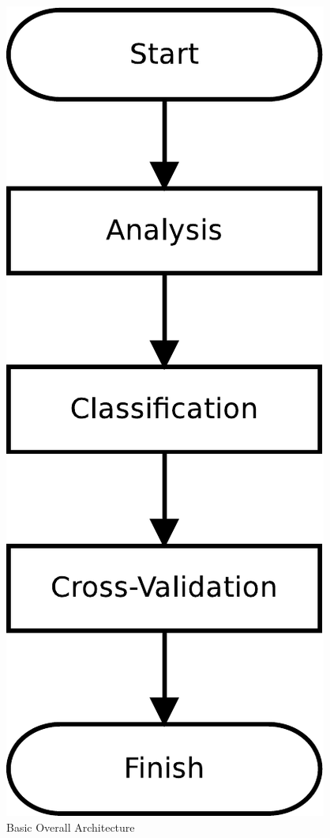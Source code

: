 \begin{figure}[h]
\includegraphics[width=\linewidth]{img/basic-arch}
\caption{Basic Overall Architecture}\label{fig:basic-arch}
\end{figure}
